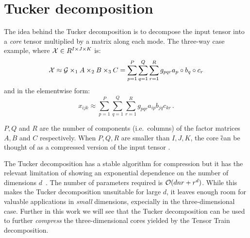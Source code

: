 \section{Tucker decomposition}
The idea behind the Tucker decomposition is to decompose the input tensor into a \emph{core} tensor multiplied by a matrix along each mode.
The three-way case example, where $\mathcal{X} \in R^{I \times J \times K}$ is:
\begin{equation*}
  \mathcal{X} \approx \mathcal{G} \times_1 A \times_2 B \times_3 C = \sum_{p=1}^P \sum_{q=1}^Q \sum_{r=1}^R g_{pqr} a_p \circ b_q \circ c_r
\end{equation*}
and in the elementwise form:
\begin{equation*}
  x_{ijk} \approx \sum_{p=1}^P \sum_{q=1}^Q \sum_{r=1}^R g_{pqr} a_{ip} b_{jq} c_{kr}\, .
\end{equation*}

$P, Q$ and $R$ are the number of components (i.e.\ columns) of the factor matrices $A, B$ and $C$ respectively. When $P,Q,R$ are smaller than $I,J,K$, the core \G can be thought of as a compressed version of the input tensor \X.

The Tucker decomposition has a stable algorithm for compression but it has the relevant limitation of showing an exponential dependence on the number of dimensions $d$~\cite{tensorreview}. The number of parameters required is $\mathcal{O}(dnr+r^d)$.
While this makes the Tucker decomposition unsuitable for large $d$, it leaves enough room for valuable applications in \emph{small} dimensions, expecially in the three-dimensional case. Further in this work we will see that the Tucker decomposition can be used to further \emph{compress} the three-dimensional cores yielded by the Tensor Train decomposition.
